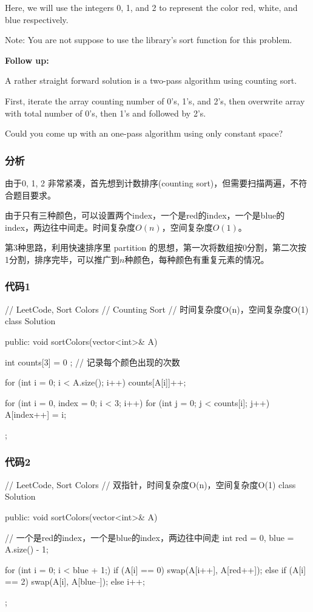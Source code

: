 Here, we will use the integers 0, 1, and 2 to represent the color red, white, and blue respectively.

Note:
You are not suppose to use the library's sort function for this problem.

\textbf{Follow up:}

A rather straight forward solution is a two-pass algorithm using counting sort.

First, iterate the array counting number of 0's, 1's, and 2's, then overwrite array with total number of 0's, then 1's and followed by 2's.

Could you come up with an one-pass algorithm using only constant space?


\subsubsection{分析}
由于0, 1, 2 非常紧凑，首先想到计数排序(counting sort)，但需要扫描两遍，不符合题目要求。

由于只有三种颜色，可以设置两个index，一个是red的index，一个是blue的index，两边往中间走。时间复杂度$O(n)$，空间复杂度$O(1)$。

第3种思路，利用快速排序里 partition 的思想，第一次将数组按0分割，第二次按1分割，排序完毕，可以推广到$n$种颜色，每种颜色有重复元素的情况。


\subsubsection{代码1}
\begin{Code}
// LeetCode, Sort Colors
// Counting Sort
// 时间复杂度O(n)，空间复杂度O(1)
class Solution {
public:
    void sortColors(vector<int>& A) {
        int counts[3] = { 0 }; // 记录每个颜色出现的次数

        for (int i = 0; i < A.size(); i++)
            counts[A[i]]++;

        for (int i = 0, index = 0; i < 3; i++)
            for (int j = 0; j < counts[i]; j++)
                A[index++] = i;

    }
};
\end{Code}


\subsubsection{代码2}
\begin{Code}
// LeetCode, Sort Colors
// 双指针，时间复杂度O(n)，空间复杂度O(1)
class Solution {
public:
    void sortColors(vector<int>& A) {
        // 一个是red的index，一个是blue的index，两边往中间走
        int red = 0, blue = A.size() - 1;

        for (int i = 0; i < blue + 1;) {
            if (A[i] == 0)
                swap(A[i++], A[red++]);
            else if (A[i] == 2)
                swap(A[i], A[blue--]);
            else
                i++;
        }
    }
};
\end{Code}


